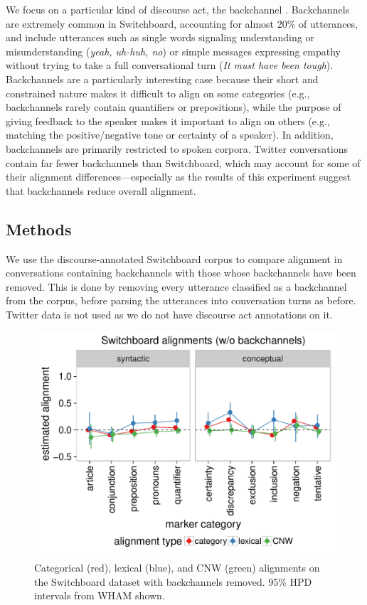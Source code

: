\documentclass[11pt]{article}
\begin{document}
We focus on a particular kind of discourse act, the backchannel \cite{Yngve1970}. Backchannels are extremely common in Switchboard, accounting for almost 20\% of utterances, and include utterances such as single words signaling understanding or misunderstanding (\textit{yeah, uh-huh, no}) or simple messages expressing empathy without trying to take a full conversational turn (\textit{It must have been tough}).  Backchannels are a particularly interesting case because their short and constrained nature makes it difficult to align on some categories (e.g., backchannels rarely contain quantifiers or prepositions), while the purpose of giving feedback to the speaker makes it important to align on others (e.g., matching the positive/negative tone or certainty of a speaker).  In addition, backchannels are primarily restricted to spoken corpora. Twitter conversations contain far fewer backchannels than Switchboard, which may account for some of their alignment differences---especially as the results of this experiment suggest that backchannels reduce overall alignment.



\subsection{Methods}

We use the discourse-annotated Switchboard corpus to compare alignment in conversations containing backchannels with those whose backchannels have been removed. This is done by removing every utterance classified as a backchannel from the corpus, before parsing the utterances into conversation turns as before. Twitter data is not used as we do not have discourse act annotations on it.

\begin{figure}[t]
  \begin{center}
    \includegraphics[width=\columnwidth]{results/swbdn_line.pdf}
  \end{center}
  \caption{Categorical (red), lexical (blue), and CNW (green) alignments on the Switchboard dataset with backchannels removed. 95\% HPD intervals from WHAM shown.}\label{fig:swbdn-res}
\end{figure}
\end{document}
